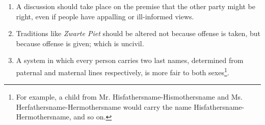 \begin{enumerate}[nosep]%
    
\item
    A discussion should take place on the premise that the other party might be right,
    even if people have appalling or ill-informed views. 
    \item 
    Traditions like \textit{Zwarte Piet} should be altered
    not because offense is taken,
    but because offense is given; which is uncivil.
    \item
        A system in which every person carries two last names, 
        determined from paternal and maternal lines respectively,
        is more fair to both sexes\footnote{
        For example, a child from Mr. Hisfathersname-Hismothersname and Ms. Herfathersname-Hermothersname 
        would carry the name Hisfathersname-Hermothersname, and so on.        
        }.

\end{enumerate}
